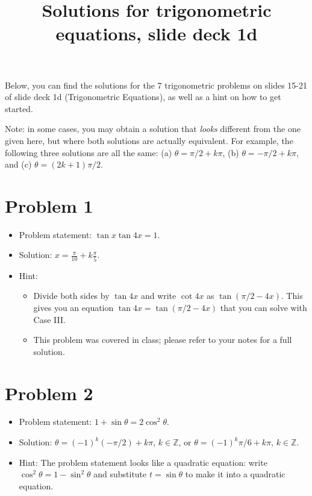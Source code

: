 \documentclass{amsart}
\title{Solutions for trigonometric equations, slide deck 1d}
\begin{document}
\maketitle

Below, you can find the solutions for the 7 trigonometric problems on slides
15-21 of slide deck 1d (Trigonometric Equations), as well as a hint on how to
get started.

Note: in some cases, you may obtain a solution that \emph{looks} different from the one given here, but where both solutions are actually equivalent. For example, the following three solutions are all the same: (a) $\theta = \pi/2 + k\pi$, (b) $\theta = - \pi/2 + k \pi$, and (c) $\theta = (2k + 1) \pi/2$.

\section*{Problem 1}

\begin{itemize}
  \item Problem statement: $\tan x \tan 4x = 1$.
  \item Solution: $x = \frac{\pi}{10} + k \frac{\pi}{5}$.
  \item Hint:
    \begin{itemize}
    \item Divide both sides by $\tan 4x$ and write $\cot 4x$ as $\tan \left( \pi/2 - 4x\right)$. This gives you an equation $\tan 4x = \tan (\pi/2 - 4x)$ that you can solve with Case III.
    \item This problem was covered in class; please refer to your notes for a full solution.
    \end{itemize}
  \end{itemize}  

\section*{Problem 2}

\begin{itemize}
  \item Problem statement: $1 + \sin \theta = 2\cos^2\theta$.
  \item Solution: $\theta = (-1)^k (-\pi/2) + k \pi$, $k \in \mathbb{Z}$, or $\theta = (-1)^k \pi/6 + k \pi$, $k \in \mathbb{Z}$.
  \item Hint: The problem statement looks like a quadratic equation: write $\cos^2 \theta = 1 - \sin^2 \theta$ and substitute $t = \sin \theta$ to make it into a quadratic equation.
  \end{itemize}  
\end{document}
